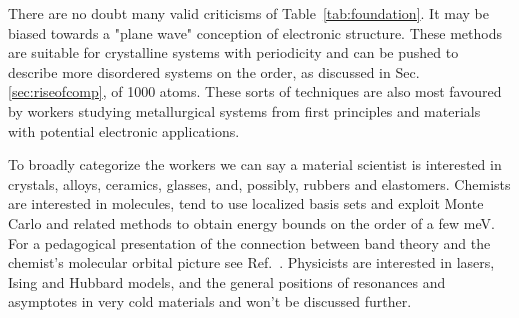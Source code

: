 \begin{table}
\caption{Citations are relevant up to Nov. 2017. Citations are according 
to the journals in which they appear. 
The actual number of citations are much higher. 
\label{tab:theoreticalpapers}}
\end{table}

There are no doubt many valid criticisms of Table~\ref{tab:foundation}.
It may be biased towards a "plane wave" conception of electronic structure. 
These methods are suitable for crystalline systems with periodicity and can be pushed 
to describe more disordered systems on the order, as discussed in Sec.\ref{sec:riseofcomp}, 
of 1000 atoms. These sorts of techniques are also most favoured by workers studying metallurgical
systems from first principles and materials with potential electronic applications.

To broadly categorize the workers we can say a material scientist 
is interested in crystals, alloys, ceramics, glasses, and, possibly, rubbers and elastomers. 
Chemists are interested in molecules, 
tend to use localized basis sets and exploit Monte Carlo and 
related methods to obtain energy bounds on the order of a few meV. 
For a pedagogical presentation of the connection between band 
theory and the chemist's molecular orbital picture 
see Ref.~\cite{hoffman87}. Physicists are interested in lasers, 
Ising and Hubbard models, and the general positions of resonances 
and asymptotes in very cold materials and won't be discussed further. 

